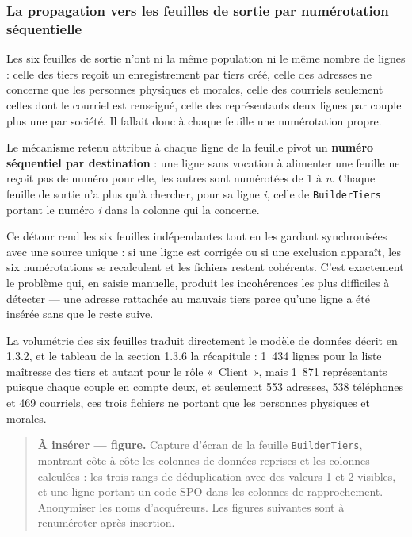 \hypertarget{la-propagation-vers-les-feuilles-de-sortie-par-numuxe9rotation-suxe9quentielle}{%
\subsubsection{La propagation vers les feuilles de sortie par numérotation séquentielle}\label{la-propagation-vers-les-feuilles-de-sortie-par-numuxe9rotation-suxe9quentielle}}

Les six feuilles de sortie n'ont ni la même population ni le même nombre de lignes : celle des
tiers reçoit un enregistrement par tiers créé, celle des adresses ne concerne que les
personnes physiques et morales, celle des courriels seulement celles dont le courriel est
renseigné, celle des représentants deux lignes par couple plus une par société. Il fallait
donc à chaque feuille une numérotation propre.

Le mécanisme retenu attribue à chaque ligne de la feuille pivot un \textbf{numéro séquentiel par
destination} : une ligne sans vocation à alimenter une feuille ne reçoit pas de numéro pour
elle, les autres sont numérotées de 1 à \emph{n}. Chaque feuille de sortie n'a plus qu'à chercher,
pour sa ligne \emph{i}, celle de \texttt{BuilderTiers} portant le numéro \emph{i} dans la colonne qui la
concerne.

Ce détour rend les six feuilles indépendantes tout en les gardant synchronisées avec une
source unique : si une ligne est corrigée ou si une exclusion apparaît, les six numérotations
se recalculent et les fichiers restent cohérents. C'est exactement le problème qui, en saisie
manuelle, produit les incohérences les plus difficiles à détecter --- une adresse rattachée au
mauvais tiers parce qu'une ligne a été insérée sans que le reste suive.

La volumétrie des six feuilles traduit directement le modèle de données décrit en 1.3.2, et le
tableau de la section 1.3.6 la récapitule : 1~434 lignes pour la liste maîtresse des tiers et
autant pour le rôle «~Client~», mais 1~871 représentants puisque chaque couple en compte deux,
et seulement 553 adresses, 538 téléphones et 469 courriels, ces trois fichiers ne portant que
les personnes physiques et morales.

\begin{quote}
\textbf{À insérer --- figure.} Capture d'écran de la feuille \texttt{BuilderTiers}, montrant côte à
côte les colonnes de données reprises et les colonnes calculées : les trois rangs de
déduplication avec des valeurs 1 et 2 visibles, et une ligne portant un code SPO dans les
colonnes de rapprochement. Anonymiser les noms d'acquéreurs. Les figures suivantes sont à
renuméroter après insertion.
\end{quote}

